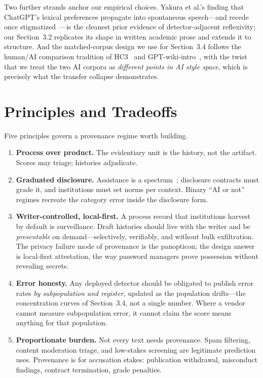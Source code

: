 \documentclass[sigconf,nonacm]{acmart}
\begin{document}
Two further strands anchor our empirical choices. Yakura et al.'s finding that ChatGPT's lexical preferences propagate into spontaneous speech---and recede once stigmatized~\cite{r2}---is the cleanest prior evidence of detector-adjacent reflexivity; our Section~3.2 replicates its shape in written academic prose and extends it to structure. And the matched-corpus design we use for Section~3.4 follows the human/AI comparison tradition of HC3~\cite{r7} and GPT-wiki-intro~\cite{r8}, with the twist that we treat the two AI corpora as \emph{different points in AI style space}, which is precisely what the transfer collapse demonstrates.

\section{Principles and Tradeoffs}

Five principles govern a provenance regime worth building.

\begin{enumerate}
\item \textbf{Process over product.} The evidentiary unit is the history, not the artifact. Scores may triage; histories adjudicate.
\item \textbf{Graduated disclosure.} Assistance is a spectrum~\cite{r1}; disclosure contracts must grade it, and institutions must set norms per context. Binary ``AI or not'' regimes recreate the category error inside the disclosure form.
\item \textbf{Writer-controlled, local-first.} A process record that institutions harvest by default is surveillance. Draft histories should live with the writer and be \emph{presentable} on demand---selectively, verifiably, and without bulk exfiltration. The privacy failure mode of provenance is the panopticon; the design answer is local-first attestation, the way password managers prove possession without revealing secrets.
\item \textbf{Error honesty.} Any deployed detector should be obligated to publish error rates \emph{by subpopulation and register}, updated as the population drifts---the concentration curves of Section~3.4, not a single number. Where a vendor cannot measure subpopulation error, it cannot claim the score means anything for that population.
\item \textbf{Proportionate burden.} Not every text needs provenance. Spam filtering, content moderation triage, and low-stakes screening are legitimate prediction uses. Provenance is for accusation stakes: publication withdrawal, misconduct findings, contract termination, grade penalties.
\end{enumerate}
\end{document}
